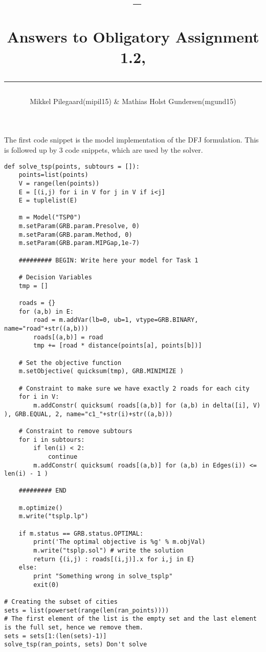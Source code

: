 \documentclass[a4paper,10pt]{article}
\title{\begin{flushleft}
\vspace{-4ex}
\courseid~-- \coursename \\[0.2cm]
{\Large Answers to Obligatory Assignment 1.2, \term \\[3ex]
\hrule}
\end{flushleft}
}
\date{}
\author{Mikkel Pilegaard(mipil15) \& Mathias Holst Gundersen(mgund15)}
\begin{document}
\maketitle


The first code snippet is the model implementation of the DFJ formulation. This is followed up by 3 code snippets, which are used by the solver.

\begin{lstlisting}
def solve_tsp(points, subtours = []):
    points=list(points)
    V = range(len(points))
    E = [(i,j) for i in V for j in V if i<j]
    E = tuplelist(E)

    m = Model("TSP0")
    m.setParam(GRB.param.Presolve, 0)
    m.setParam(GRB.param.Method, 0)
    m.setParam(GRB.param.MIPGap,1e-7)

    ######### BEGIN: Write here your model for Task 1   

    # Decision Variables
    tmp = []
    
    roads = {}
    for (a,b) in E:
        road = m.addVar(lb=0, ub=1, vtype=GRB.BINARY, name="road"+str((a,b)))
        roads[(a,b)] = road
        tmp += [road * distance(points[a], points[b])]

    # Set the objective function
    m.setObjective( quicksum(tmp), GRB.MINIMIZE )
      
    # Constraint to make sure we have exactly 2 roads for each city
    for i in V:
        m.addConstr( quicksum( roads[(a,b)] for (a,b) in delta([i], V) ), GRB.EQUAL, 2, name="c1_"+str(i)+str((a,b)))
    
    # Constraint to remove subtours
    for i in subtours:
        if len(i) < 2:
            continue
        m.addConstr( quicksum( roads[(a,b)] for (a,b) in Edges(i)) <= len(i) - 1 )
    
    ######### END
    
    m.optimize()
    m.write("tsplp.lp")
    
    if m.status == GRB.status.OPTIMAL:
        print('The optimal objective is %g' % m.objVal)
        m.write("tsplp.sol") # write the solution
        return {(i,j) : roads[(i,j)].x for i,j in E}
    else:
        print "Something wrong in solve_tsplp"
        exit(0)

# Creating the subset of cities
sets = list(powerset(range(len(ran_points))))
# The first element of the list is the empty set and the last element is the full set, hence we remove them.
sets = sets[1:(len(sets)-1)]
solve_tsp(ran_points, sets) Don't solve
\end{lstlisting}
\end{document}
